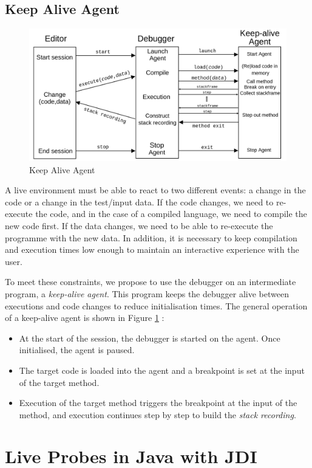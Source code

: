 \documentclass[english,submission]{programming}
\begin{document}
\subsection{Keep Alive Agent}

\begin{figure}[h]
  \centering
  \includegraphics[width=0.8\linewidth]{img/keepalive_agent.png}
  \caption{Keep Alive Agent}
  \label{fig:keepalive-agent}
\end{figure}

A live environment must be able to react to two different events: a change in the code or a change in the test/input data. 
If the code changes, we need to re-execute the code, and in the case of a compiled language, we need to compile the new code first. 
If the data changes, we need to be able to re-execute the programme with the new data. 
In addition, it is necessary to keep compilation and execution times low enough to maintain an interactive experience with the user.

To meet these constraints, we propose to use the debugger on an intermediate program, a \textit{keep-alive agent}. 
This program keeps the debugger alive between executions and code changes to reduce initialisation times. 
The general operation of a keep-alive agent is shown in Figure \ref*{fig:keepalive-agent} :
\begin{itemize}
  \item At the start of the session, the debugger is started on the agent. Once initialised, the agent is paused.
  \item The target code is loaded into the agent and a breakpoint is set at the input of the target method.
  \item Execution of the target method triggers the breakpoint at the input of the method, and execution continues step by step to build the \textit{stack recording}.
\end{itemize}

\section{Live Probes in Java with JDI}
\label{sec:live-probes-java}
\end{document}

